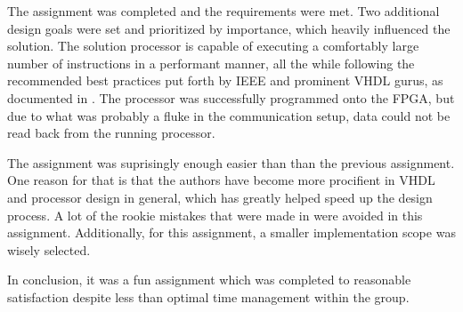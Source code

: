 The assignment was completed and the requirements were met.
Two additional design goals were set and prioritized by importance, which heavily influenced the solution.
The solution processor is capable of executing a comfortably large number of instructions in a performant manner, all the while following the recommended best practices put forth by IEEE and prominent VHDL gurus, as documented in \cite{assignment-1}.
The processor was successfully programmed onto the FPGA, but due to what was probably a fluke in the communication setup, data could not be read back from the running processor.

The assignment was suprisingly enough easier than than the previous assignment\cite{assignment-1}.
One reason for that is that the authors have become more procifient in VHDL and processor design in general, which has greatly helped speed up the design process.
A lot of the rookie mistakes that were made in \cite{assignment-1} were avoided in this assignment.
Additionally, for this assignment, a smaller implementation scope was wisely selected.

In conclusion, it was a fun assignment which was completed to reasonable satisfaction despite less than optimal time management within the group.
